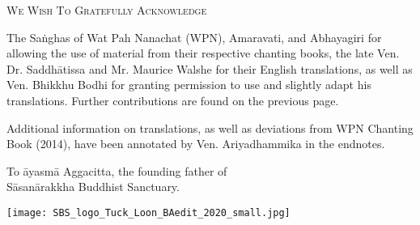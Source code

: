\cleartorecto
\thispagestyle{empty}

{\setlength{\parskip}{10pt}

{\centering\fontsize{20}{25}\selectfont
\textsc{We Wish To Gratefully Acknowledge}
\par}

The Saṅghas of Wat Pah Nanachat (WPN), Amaravati, and Abhayagiri for allowing the use of material from their respective chanting books, the late Ven. Dr. Saddhātissa and Mr. Maurice Walshe for their English translations, as well as Ven. Bhikkhu Bodhi for granting permission to use and slightly adapt his translations. Further contributions are found on the previous page.

\vspace*{1.5\baselineskip}

Additional information on translations, as well as deviations
from WPN Chanting Book (2014), have been annotated by Ven. Ariyadhammika in the endnotes.

\bigskip

{\centering
To āyasmā Aggacitta, the founding father of\\
Sāsanārakkha Buddhist Sanctuary.

\bigskip

\texttt{[image: SBS\_logo\_Tuck\_Loon\_BAedit\_2020\_small.jpg]}

}

}
